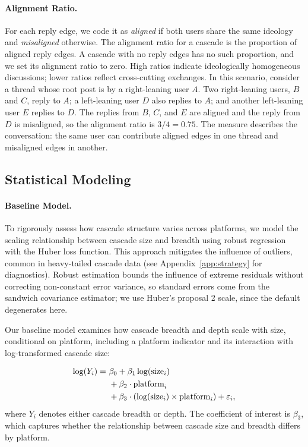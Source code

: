 \documentclass[letterpaper]{article} %
\newcommand{\rev}[1]{{\color{blue}#1}}
\begin{document}
\paragraph*{Alignment Ratio.}
For each reply edge, we code it as \textit{aligned} if both users share the same ideology and \textit{misaligned} otherwise. The alignment ratio for a cascade is the proportion of aligned reply edges. \rev{A cascade with no reply edges has no such proportion, and we set its alignment ratio to zero.} High ratios indicate ideologically homogeneous discussions; lower ratios reflect cross-cutting exchanges. \rev{In this scenario, consider a thread whose root post is by a right-leaning user $A$. Two right-leaning users, $B$ and $C$, reply to $A$; a left-leaning user $D$ also replies to $A$; and another left-leaning user $E$ replies to $D$. The replies from $B$, $C$, and $E$ are aligned and the reply from $D$ is misaligned, so the alignment ratio is $3/4 = 0.75$. The measure describes the conversation: the same user can contribute aligned edges in one thread and misaligned edges in another.} 

\subsection{Statistical Modeling}

\paragraph*{Baseline Model.}
To rigorously assess how cascade structure varies across platforms, we model the scaling relationship between cascade size and breadth using robust regression with the Huber loss function. This approach mitigates the influence of outliers, common in heavy-tailed cascade data \rev{(see Appendix~\ref{app:strategy} for diagnostics). Robust estimation bounds the influence of extreme residuals without correcting non-constant error variance, so standard errors come from the sandwich covariance estimator; we use Huber's proposal 2 scale, since the default degenerates here.}

Our baseline model examines how cascade breadth and depth scale with size, conditional on platform, including a platform indicator and its interaction with log-transformed cascade size:

\begin{align}
\label{eq:eq1}
\log(Y_i) =\ & \beta_0 + \beta_1 \log(\text{size}_i) \notag \\
             & + \beta_2 \cdot \text{platform}_i \notag \\
             & + \beta_3 \cdot \left( \log(\text{size}_i) \times \text{platform}_i \right) + \varepsilon_i ,
\end{align}
where $Y_i$ denotes either cascade breadth or depth. The coefficient of interest is $\beta_3$, which captures whether the relationship between cascade size and breadth differs by platform.
\end{document}
